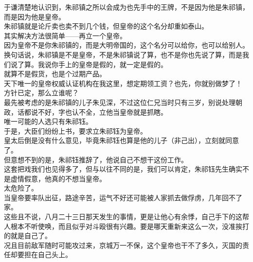 \begin{multicols}{\theparacolNo}
于谦清楚地认识到，朱祁镇之所以会成为也先手中的王牌，不是因为他是朱祁镇，而是因为他是皇帝。\\

朱祁镇就是论斤卖也卖不到几个钱，但皇帝的这个名分却重如泰山。\\

其实解决方法很简单——再立一个皇帝。\\

因为皇帝不是你朱祁镇的，而是大明帝国的，这个名分可以给你，也可以给别人。\\

换句话说，朱祁镇是不是皇帝，不是朱祁镇说了算，也不是你也先说了算，而是我们说了算。我说你手上的皇帝是假的，就一定是假的。\\

就算不是假货，也是个过期产品。\\

天下唯一的皇帝权威认证机构在我这里，想定期领工资？也先，你就别做梦了！\\

方针已定，那么立谁呢？\\

最先被考虑的是朱祁镇的儿子朱见深，不过这位仁兄当时只有三岁，别说处理朝政，话都说不好，字也认不全，立他当皇帝就是抓瞎。\\

唯一可能的人选只有朱祁钰。\\

于是，大臣们纷纷上书，要求立朱祁钰为皇帝。\\

皇太后倒是没有什么意见，毕竟朱祁钰也算是他的儿子（非己出），立刻就同意了。\\

但意想不到的是，朱祁钰推辞了，他说自己不想干这份工作。\\

这套把戏我们也见得多了，但与以往不同的是，我们可以肯定，朱祁钰先生确实不是虚情假意，他真的不想当皇帝。\\

太危险了。\\

当皇帝要率队出征，路途辛苦，运气不好还可能被人家抓去做俘虏，几年回不了家。\\

这些且不说，八月二十三日那天发生的事情，更是让他心有余悸，自己手下的这帮人根本不听使唤，而且似乎对斗殴很有兴趣。要是哪天重新来这么一次，没准挨打的就是自己了。\\

况且目前敌军随时可能攻过来，京城万一不保，这个皇帝也干不了多久，灭国的责任却要担在自己头上。\\


\end{multicols}
